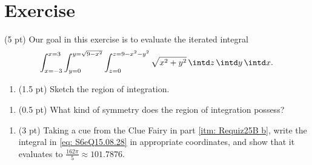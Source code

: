 %
%
\section{Exercise}

(5 pt) Our goal in this exercise is to evaluate the iterated integral
\begin{align}
\int_{x = -3}^{x = 3} \int_{y = 0}^{y = \sqrt{9 - x^{2}}} \int_{z = 0}^{z = 9 - x^{2} - y^{2}} \sqrt{x^{2} + y^{2}} \, \intd z \, \intd y \, \intd x.%
\label{eq: S6eQ15.08.28}
\end{align}
\begin{enumerate}[label=(\alph*)]
\item (1.5 pt) Sketch the region of integration.
\end{enumerate}

\spaceSolution{1.5in}{}


\begin{enumerate}[resume,label=(\alph*)]
\item\label{itm: Requiz25B b} (0.5 pt) What kind of symmetry does the region of integration possess? 
\end{enumerate}

\spaceSolution{0.5in}{}


\begin{enumerate}[resume,label=(\alph*)]
\item (3 pt) Taking a cue from the Clue Fairy in part \ref{itm: Requiz25B b}, write the integral in \eqref{eq: S6eQ15.08.28} in appropriate coordinates, and show that it evaluates to $\frac{162 \pi}{5} \approx 101.7876$.
\end{enumerate}

